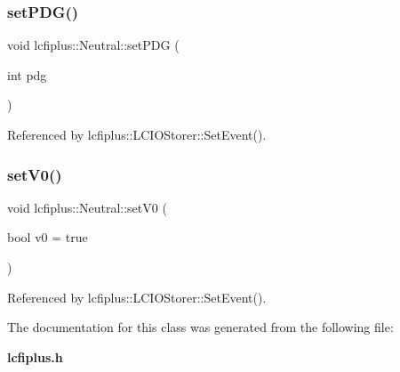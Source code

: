 \mbox{\label{classlcfiplus_1_1Neutral_a1fb16c8c4c8f87d595c4faba85f427ef}} 
\subsubsection{set\+P\+D\+G()}
{\footnotesize\ttfamily void lcfiplus\+::\+Neutral\+::set\+P\+DG (\begin{DoxyParamCaption}\item[{int}]{pdg }\end{DoxyParamCaption})\hspace{0.3cm}{\ttfamily [inline]}}



Referenced by lcfiplus\+::\+L\+C\+I\+O\+Storer\+::\+Set\+Event().

\mbox{\label{classlcfiplus_1_1Neutral_ae6cafdfaae812d849d340c1a0c2ac75f}} 
\subsubsection{set\+V0()}
{\footnotesize\ttfamily void lcfiplus\+::\+Neutral\+::set\+V0 (\begin{DoxyParamCaption}\item[{bool}]{v0 = {\ttfamily true} }\end{DoxyParamCaption})\hspace{0.3cm}{\ttfamily [inline]}}



Referenced by lcfiplus\+::\+L\+C\+I\+O\+Storer\+::\+Set\+Event().



The documentation for this class was generated from the following file\+:\begin{DoxyCompactItemize}
\item 
\textbf{ lcfiplus.\+h}\end{DoxyCompactItemize}
